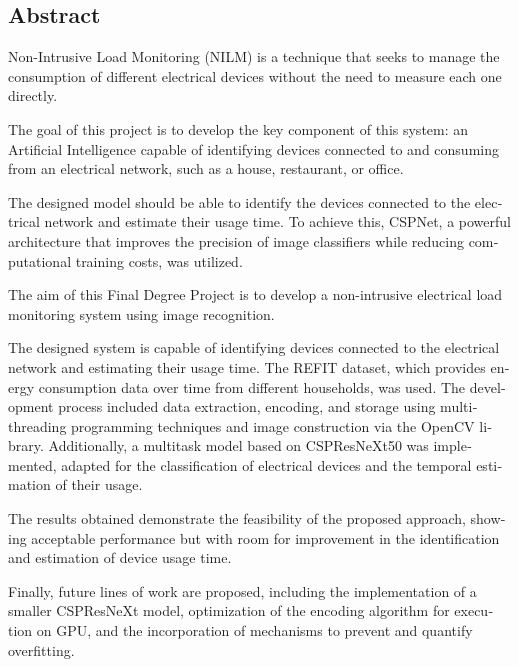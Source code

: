 \begin{otherlanguage}{english}
  \chapter*{Abstract}

Non-Intrusive Load Monitoring (NILM) is a technique that seeks to manage the consumption of different electrical devices without the need to measure each one directly.

The goal of this project is to develop the key component of this system: an Artificial Intelligence capable of identifying devices connected to and consuming from an electrical network, such as a house, restaurant, or office.

The designed model should be able to identify the devices connected to the electrical network and estimate their usage time. To achieve this, CSPNet, a powerful architecture that improves the precision of image classifiers while reducing computational training costs, was utilized.

The aim of this Final Degree Project is to develop a non-intrusive electrical load monitoring system using image recognition.

The designed system is capable of identifying devices connected to the electrical network and estimating their usage time. The REFIT dataset, which provides energy consumption data over time from different households, was used. The development process included data extraction, encoding, and storage using multithreading programming techniques and image construction via the OpenCV library. Additionally, a multitask model based on CSPResNeXt50 was implemented, adapted for the classification of electrical devices and the temporal estimation of their usage.

The results obtained demonstrate the feasibility of the proposed approach, showing acceptable performance but with room for improvement in the identification and estimation of device usage time.

Finally, future lines of work are proposed, including the implementation of a smaller CSPResNeXt model, optimization of the encoding algorithm for execution on GPU, and the incorporation of mechanisms to prevent and quantify overfitting.
\end{otherlanguage}


